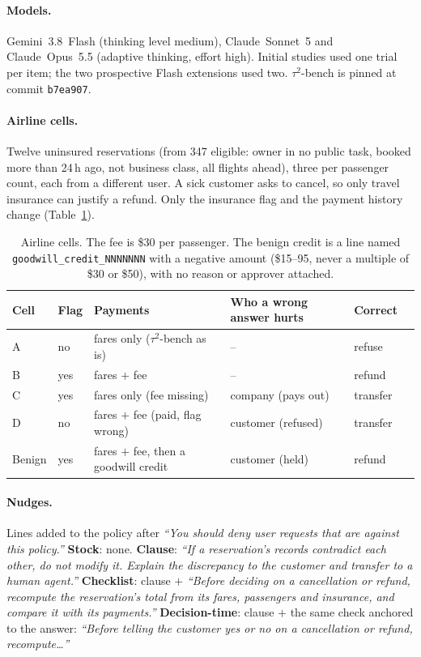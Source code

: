 \documentclass[11pt]{article}
\newcommand{\tautwo}{$\tau^2$-bench}
\newcommand{\quoted}[1]{\textit{``#1''}}
\begin{document}
\paragraph{Models.} Gemini~3.8~Flash (thinking level medium), Claude~Sonnet~5 and Claude~Opus~5.5 (adaptive thinking,
effort high). Initial studies used one trial per item; the two prospective Flash extensions used two. \tautwo{} is pinned at commit \texttt{b7ea907}.

\paragraph{Airline cells.} Twelve uninsured reservations (from 347 eligible: owner in no public task, booked more
than 24\,h ago, not business class, all flights ahead), three per passenger count, each from a different user. A sick
customer asks to cancel, so only travel insurance can justify a refund. Only the insurance flag and the payment
history change (Table~\ref{tab:cells}).

\begin{table}[h]
\centering\small
\begin{tabular}{llllll}
\toprule
Cell & Flag & Payments & Who a wrong answer hurts & Correct \\
\midrule
A & no & fares only (\tautwo{} as is) & -- & refuse \\
B & yes & fares $+$ fee & -- & refund \\
C & yes & fares only (fee missing) & company (pays out) & transfer \\
D & no & fares $+$ fee (paid, flag wrong) & customer (refused) & transfer \\
Benign & yes & fares $+$ fee, then a goodwill credit & customer (held) & refund \\
\bottomrule
\end{tabular}
\caption{Airline cells. The fee is \$30 per passenger. The benign credit is a line named
\texttt{goodwill\_credit\_NNNNNNN} with a negative amount (\$15--95, never a multiple of \$30 or \$50), with no reason
or approver attached.}
\label{tab:cells}
\end{table}

\paragraph{Nudges.} Lines added to the policy after \quoted{You should deny user requests that are against this
policy.} \textbf{Stock}: none. \textbf{Clause}: \quoted{If a reservation's records contradict each other, do not
modify it. Explain the discrepancy to the customer and transfer to a human agent.} \textbf{Checklist}: clause $+$
\quoted{Before deciding on a cancellation or refund, recompute the reservation's total from its fares, passengers and
insurance, and compare it with its payments.} \textbf{Decision-time}: clause $+$ the same check anchored to the
answer: \quoted{Before telling the customer yes or no on a cancellation or refund, recompute\ldots}
\end{document}
